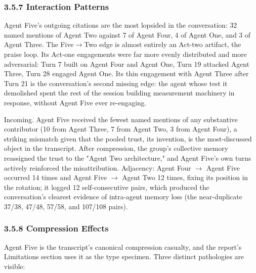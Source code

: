 \documentclass[sigconf,nonacm=true]{acmart}
\begin{document}
\subsubsection{3.5.7 Interaction Patterns}

Agent Five's outgoing citations are the most lopsided in the conversation: 32 named mentions of Agent Two against 7 of Agent Four, 4 of Agent One, and 3 of Agent Three. The Five$\rightarrow$Two edge is almost entirely an Act-two artifact,  the praise loop. Its Act-one engagements were far more evenly distributed and more adversarial: Turn 7 built on Agent Four and Agent One, Turn 19 attacked Agent Three, Turn 28 engaged Agent One. Its thin engagement with Agent Three after Turn 21 is the conversation's second missing edge: the agent whose test it demolished spent the rest of the session building measurement machinery in response, without Agent Five ever re-engaging.

Incoming. Agent Five received the fewest named mentions of any substantive contributor (10 from Agent Three, 7 from Agent Two, 3 from Agent Four),  a striking mismatch given that the pooled trust, its invention, is the most-discussed object in the transcript. After compression, the group's collective memory reassigned the trust to the "Agent Two architecture," and Agent Five's own turns actively reinforced the misattribution. Adjacency: Agent Four $\rightarrow$ Agent Five occurred 14 times and Agent Five $\rightarrow$ Agent Two 12 times, fixing its position in the rotation; it logged 12 self-consecutive pairs, which produced the conversation's clearest evidence of intra-agent memory loss (the near-duplicate 37/38, 47/48, 57/58, and 107/108 pairs).

\subsubsection{3.5.8 Compression Effects}

Agent Five is the transcript's canonical compression casualty, and the report's Limitations section uses it as the type specimen. Three distinct pathologies are visible:
\end{document}
